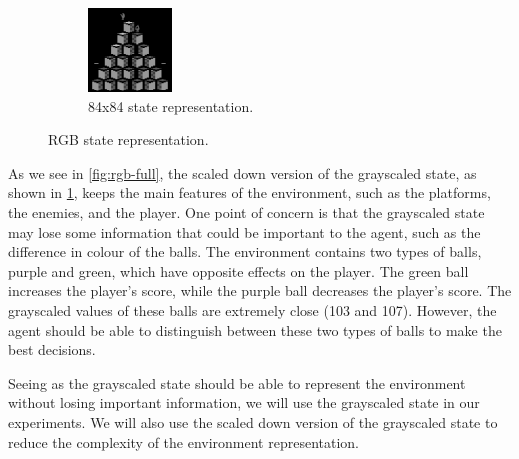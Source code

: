 \begin{figure}[H]
\begin{subfigure}{0.45\textwidth}
        \centering
        \includegraphics[width=\textwidth]{img/gray-84x84-sam.png}
        \caption{84x84 state representation.}
        \label{fig:rgb-84x84}
    \end{subfigure}
    \caption{RGB state representation.}
    \label{fig:rgb-state}
\end{figure}

As we see in \cref{fig:rgb-full}, the scaled down version of the grayscaled
state, as shown in \cref{fig:rgb-84x84}, keeps the main features of the
environment, such as the platforms, the enemies, and the player. One point of
concern is that the grayscaled state may lose some information that could be
important to the agent, such as the difference in colour of the balls. The
environment contains two types of balls, purple and green, which have opposite
effects on the player. The green ball increases the player's score, while the
purple ball decreases the player's score. The grayscaled values of these
balls are extremely close (103 and 107). However, the agent should be able to
distinguish between these two types of balls to make the best decisions.

Seeing as the grayscaled state should be able to represent the environment
without losing important information, we will use the grayscaled state in our
experiments. We will also use the scaled down version of the grayscaled state
to reduce the complexity of the environment representation.